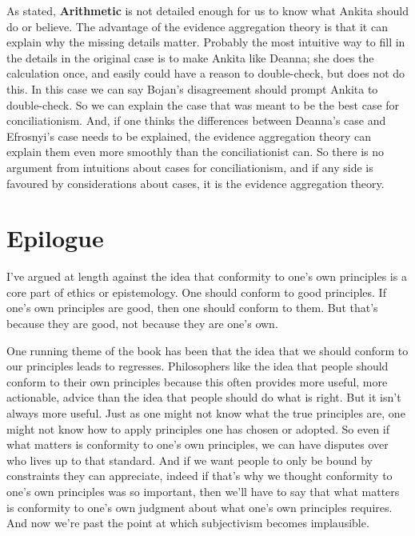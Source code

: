 \documentclass[
  10pt,
  letterpaper,
  twoside]{scrbook}
\begin{document}
As stated, \textbf{Arithmetic} is not detailed enough for us to know
what {Ankita} should do or believe. The advantage of the evidence
aggregation theory is that it can explain why the missing details
matter. Probably the most intuitive way to fill in the details in the
original case is to make {Ankita} like {Deanna}; she does the
calculation once, and easily could have a reason to double-check, but
does not do this. In this case we can say {Bojan}'s disagreement should
prompt {Ankita} to double-check. So we can explain the case that was
meant to be the best case for conciliationism. And, if one thinks the
differences between {Deanna}'s case and Efrosnyi's case needs to be
explained, the evidence aggregation theory can explain them even more
smoothly than the conciliationist can. So there is no argument from
intuitions about cases for conciliationism, and if any side is favoured
by considerations about cases, it is the evidence aggregation theory.


\chapter{Epilogue}\label{epilogue}

I've argued at length against the idea that conformity to one's own
principles is a core part of ethics or epistemology. One should conform
to good principles. If one's own principles are good, then one should
conform to them. But that's because they are good, not because they are
one's own.

One running theme of the book has been that the idea that we should
conform to our principles leads to regresses. Philosophers like the idea
that people should conform to their own principles because this often
provides more useful, more actionable, advice than the idea that people
should do what is right. But it isn't always more useful. Just as one
might not know what the true principles are, one might not know how to
apply principles one has chosen or adopted. So even if what matters is
conformity to one's own principles, we can have disputes over who lives
up to that standard. And if we want people to only be bound by
constraints they can appreciate, indeed if that's why we thought
conformity to one's own principles was so important, then we'll have to
say that what matters is conformity to one's own judgment about what
one's own principles requires. And now we're past the point at which
subjectivism becomes implausible.
\end{document}
